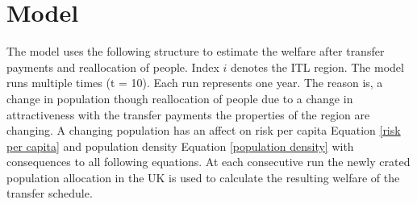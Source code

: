 \documentclass[10pt,a4paper]{article}
\begin{document}
\section{Model}
The model uses the following structure to estimate the welfare after transfer payments and reallocation of people. Index $i$ denotes the ITL region.
The model runs multiple times (t = 10). Each run represents one year. The reason is, a change in population though reallocation of people due to a change in attractiveness with the transfer payments the properties of the region are changing. A changing population has an affect on risk per capita Equation \ref{risk per capita} and population density Equation \ref{population density} with consequences to all following equations. At each consecutive run the newly crated population allocation in the UK is used to calculate the resulting welfare of the transfer schedule.
\newline
\end{document}
